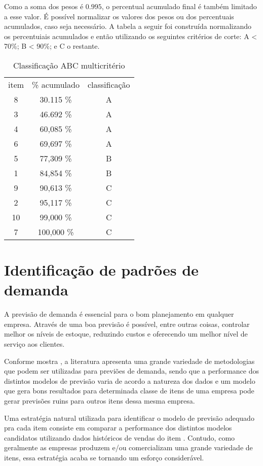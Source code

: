 \documentclass{book}
\begin{document}
Como a soma dos pesos é $0.995$, o percentual acumulado final é também limitado a esse valor. É possível normalizar os valores dos pesos ou dos percentuais acumulados, caso seja necessário. A tabela a seguir foi construída normalizando os percentuiais acumulados e então utilizando os seguintes critérios de corte: A < 70\%; B < 90\%; e C o restante.

\begin{table}[h]
\begin{center}
\begin{tabular}[c]{c c c }
item & \% acumulado & classificação \\
 8 &  30.115 \% & A \\
 3 &  46.692 \% & A \\
 4 &  60,085 \% & A \\
 6 &  69,697 \% & A \\
 5 &  77,309 \% & B \\
 1 &  84,854 \% & B \\
 9 &  90,613 \% & C \\
 2 &  95,117 \% & C \\
10 &  99,000 \% & C \\
 7 & 100,000 \% & C \\
\end{tabular}
\caption{Classificação ABC multicritério}
\label{tab:classABCMult}
\end{center}
\end{table}

\chapter{Identificação de padrões de demanda}
\label{ch:demandPatter}

A previsão de demanda é essencial para o bom planejamento em qualquer empresa. Através de uma boa previsão é possível, entre outras coisas, controlar melhor os níveis de estoque, reduzindo custos e oferecendo um melhor nível de serviço aos clientes. 

Conforme mostra \cite{MakridakisHibon2000}, a literatura apresenta uma grande variedade de metodologias que podem ser utilizadas para previões de demanda, sendo que a performance dos distintos modelos de previsão varia de acordo a natureza dos dados e um modelo que gera bons resultados para determinada classe de itens de uma empresa pode gerar previsões ruins para outros itens dessa mesma empresa.

Uma estratégia natural utilizada para identificar o modelo de previsão adequado pra cada item consiste em comparar a performance dos distintos modelos candidatos utilizando dados históricos de vendas do item \citep{UlrichEtAl2022}. Contudo, como geralmente as empresas produzem e/ou comercializam uma grande variedade de itens, essa estratégia acaba se tornando um esforço considerável. 
\end{document}
